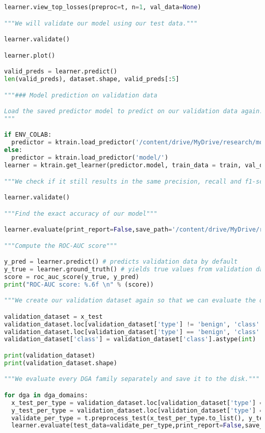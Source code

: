 \begin{lstlisting}[language=Python]
learner.view_top_losses(preproc=t, n=1, val_data=None)

"""We will validate our model using our test data."""

learner.validate()

learner.plot()

valid_preds = learner.predict()
len(valid_preds), dataset.shape, valid_preds[:5]

"""### Model prediction on validation data

Load the saved predictor model to predict on our validation data again. This time we will evaluate and validate each specific DGA family separately.
"""

if ENV_COLAB:
  predictor = ktrain.load_predictor('/content/drive/MyDrive/research/model/')
else:
  predictor = ktrain.load_predictor('model/')
learner = ktrain.get_learner(predictor.model, train_data = train, val_data = val, batch_size = 6)

"""We check if it still results in the same precision, recall and f1-score value as before saving the model."""

learner.validate()

"""Find the exact accuracy of our model"""

learner.evaluate(print_report=False,save_path='/content/drive/MyDrive/research/DistilBERT_detector_classification.csv')

"""Compute the ROC-AUC score"""

y_pred = learner.predict() # predicts validation data by default
y_true = learner.ground_truth() # yields true values from validation data by default
score = roc_auc_score(y_true, y_pred)
print("ROC-AUC score: %.6f \n" % (score))

"""We create our validation dataset again so that we can evaluate the dataset on each type of DGA family."""

validation_dataset = x_test
validation_dataset.loc[validation_dataset['type'] != 'benign', 'class' ] = 1
validation_dataset.loc[validation_dataset['type'] == 'benign', 'class' ] = 0
validation_dataset['class'] = validation_dataset['class'].astype(int)

print(validation_dataset)
print(validation_dataset.shape)

"""We evaluate every DGA family separately and save it to the disk."""

for dga in dga_domains:
  x_test_per_type = validation_dataset.loc[validation_dataset['type'] == dga.split(".")[0]].iloc[:,0]
  y_test_per_type = validation_dataset.loc[validation_dataset['type'] == dga.split(".")[0]].iloc[:,2]
  validate_per_type = t.preprocess_test(x_test_per_type.to_list(), y_test_per_type.to_list())
  learner.evaluate(test_data=validate_per_type,print_report=False,save_path='/content/drive/MyDrive/research/classifaction_' + dga)


\end{lstlisting}
